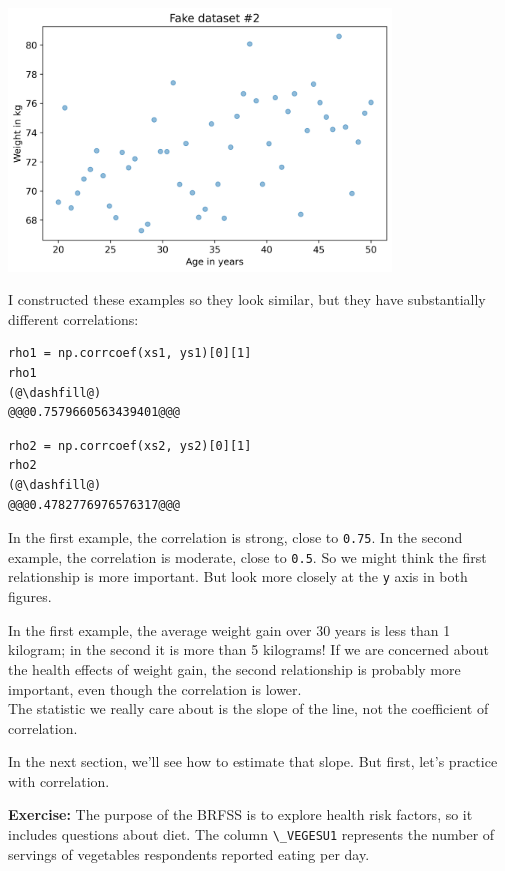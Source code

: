 \begin{center}
\includegraphics[width=4in]{chapters/09_relationships_files/09_relationships_68_0.png}
\end{center}

I constructed these examples so they look similar, but they have
substantially different correlations:

\begin{lstlisting}[]
rho1 = np.corrcoef(xs1, ys1)[0][1]
rho1
(@\dashfill@)
@@@0.7579660563439401@@@
\end{lstlisting}

\begin{lstlisting}[]
rho2 = np.corrcoef(xs2, ys2)[0][1]
rho2
(@\dashfill@)
@@@0.4782776976576317@@@
\end{lstlisting}

In the first example, the correlation is strong, close to
\passthrough{\lstinline!0.75!}. In the second example, the correlation
is moderate, close to \passthrough{\lstinline!0.5!}. So we might think
the first relationship is more important. But look more closely at the
\passthrough{\lstinline!y!} axis in both figures.

In the first example, the average weight gain over 30 years is less than
1 kilogram; in the second it is more than 5 kilograms! If we are
concerned about the health effects of weight gain, the second
relationship is probably more important, even though the correlation is
lower.\\
The statistic we really care about is the slope of the line, not the
coefficient of correlation.

In the next section, we'll see how to estimate that slope. But first,
let's practice with correlation.

\textbf{Exercise:} The purpose of the BRFSS is to explore health risk
factors, so it includes questions about diet. The column
\passthrough{\lstinline!\_VEGESU1!} represents the number of servings of
vegetables respondents reported eating per day.

